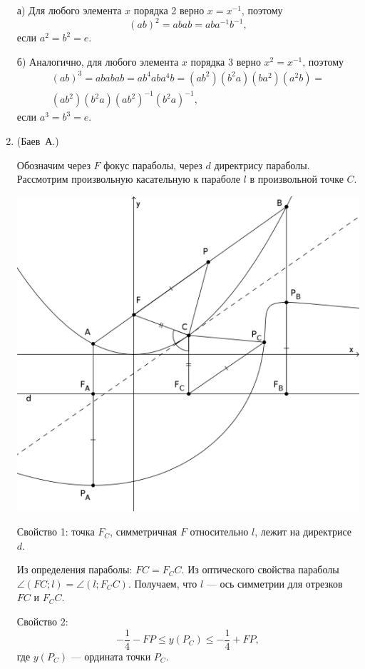 \documentclass[11pt, a4paper]{article}
\begin{document}
\begin{enumerate}
а) Для любого элемента $x$ порядка 2 верно $x=x^{-1}$, поэтому
$$
(ab)^2=abab=aba^{-1}b^{-1},
$$
если $a^2=b^2=e$.

б) Аналогично, для любого элемента $x$ порядка 3 верно $x^2=x^{-1}$, поэтому
\begin{multline*}
(ab)^3=ababab=ab^4aba^4b=(ab^2)(b^2a)(ba^2)(a^2b)=\\
(ab^2)(b^2a)(ab^2)^{-1}(b^2a)^{-1},
\end{multline*}
если $a^3=b^3=e$.

\item (Баев~А.)

Обозначим через $F$ фокус параболы,  через $d$ директрису параболы. Рассмотрим произвольную касательную к параболе $l$ в произвольной точке $C$.

\begin{center}
\includegraphics[scale=0.9]{pictures/2017-republic}
\end{center}

Свойство 1: точка $F_C$, симметричная $F$ относительно $l$, лежит на директрисе $d$. 

Из определения параболы: $FC = F_CC$. Из оптического свойства параболы $\angle(FC; l) = \angle(l; F_CC)$. Получаем, что $l$ --- ось симметрии для отрезков $FC$ и $F_CC$. 

Свойство 2: $$ -\frac{1}{4} - FP \leqslant y(P_C)  \leqslant -\frac{1}{4} + FP,$$
где $y(P_C)$ --- ордината точки $P_C$.


\end{enumerate}
\end{document}
